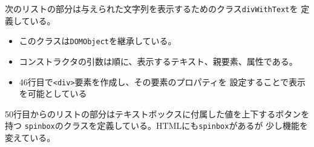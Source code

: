 次のリストの部分は与えられた文字列を表示するためのクラス\texttt{divWithText}を
定義している。
\begin{itemize}
 \item このクラスは\texttt{DOMObject}を継承している。
 \item コンストラクタの引数は順に、表示するテキスト、親要素、属性である。
 \item 46行目で\texttt{<div>}要素を作成し、その要素のプロパティを
       設定することで表示を可能としている
\end{itemize}

50行目からのリストの部分はテキストボックスに付属した値を上下するボタンを持つ
\texttt{spinbox}のクラスを定義している。HTMLにも\texttt{spinbox}があるが
少し機能を変えている。

